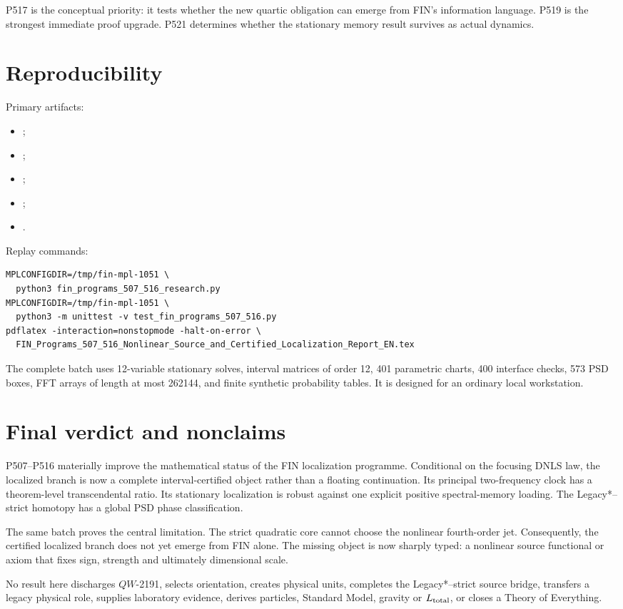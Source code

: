 \documentclass[11pt,a4paper]{article}
\theoremstyle{definition}
\theoremstyle{remark}
\begin{document}
P517 is the conceptual priority: it tests whether the new quartic obligation can emerge from FIN's information language. P519 is the strongest immediate proof upgrade. P521 determines whether the stationary memory result survives as actual dynamics.

\section{Reproducibility}

Primary artifacts:
\begin{itemize}
\item {};
\item {};
\item {};
\item {};
\item {}.
\end{itemize}

Replay commands:
\begin{verbatim}
MPLCONFIGDIR=/tmp/fin-mpl-1051 \
  python3 fin_programs_507_516_research.py
MPLCONFIGDIR=/tmp/fin-mpl-1051 \
  python3 -m unittest -v test_fin_programs_507_516.py
pdflatex -interaction=nonstopmode -halt-on-error \
  FIN_Programs_507_516_Nonlinear_Source_and_Certified_Localization_Report_EN.tex
\end{verbatim}

The complete batch uses 12-variable stationary solves, interval matrices of order 12, 401 parametric charts, 400 interface checks, 573 PSD boxes, FFT arrays of length at most 262144, and finite synthetic probability tables. It is designed for an ordinary local workstation.

\section{Final verdict and nonclaims}

P507--P516 materially improve the mathematical status of the FIN localization programme. Conditional on the focusing DNLS law, the localized branch is now a complete interval-certified object rather than a floating continuation. Its principal two-frequency clock has a theorem-level transcendental ratio. Its stationary localization is robust against one explicit positive spectral-memory loading. The Legacy*--strict homotopy has a global PSD phase classification.

The same batch proves the central limitation. The strict quadratic core cannot choose the nonlinear fourth-order jet. Consequently, the certified localized branch does not yet emerge from FIN alone. The missing object is now sharply typed: a nonlinear source functional or axiom that fixes sign, strength and ultimately dimensional scale.

No result here discharges $QW$-2191, selects orientation, creates physical units, completes the Legacy*--strict source bridge, transfers a legacy physical role, supplies laboratory evidence, derives particles, Standard Model, gravity or $L_{\rm total}$, or closes a Theory of Everything.
\end{document}
